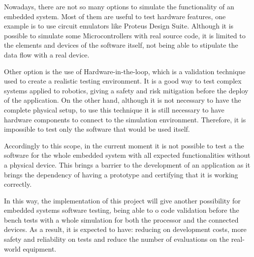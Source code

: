 \documentclass[../../monografia.tex]{subfiles}
\begin{document}

Nowadays, there are not so many options to simulate the functionality of an embedded system. Most of them are useful to test hardware features, one example is to use circuit emulators like Proteus Design Suite. Although it is possible to simulate some Microcontrollers with real source code, it is limited to the  elements and devices of the software itself, not being able to stipulate the data flow with a real device.

Other option is the use of Hardware-in-the-loop, which is a validation technique used to create a realistic testing environment. It is a good way to test complex systems applied to robotics, giving a safety and risk mitigation before the deploy of the application. On the other hand, although it is not necessary to have the complete physical setup, to use this technique it is still necessary to have hardware components to connect to the simulation environment. Therefore, it is impossible to test only the software that would be used itself.

Accordingly to this scope, in the current moment it is not possible to test a the software for the whole embedded system with all expected functionalities without a physical device. This brings a barrier to the development of an application as it brings the dependency of having a prototype and certifying that it is working correctly.

In this way, the implementation of this project will give another possibility for embedded systems software testing, being able to o code validation before the bench tests with a whole simulation for both the processor and the connected devices. As a result, it is expected to have: reducing on development costs, more safety and reliability on tests and reduce the number of evaluations on the real-world equipment.
 
\end{document}
